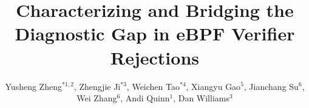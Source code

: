 \documentclass[sigplan,10pt]{acmart}
\begin{document}
\title{Characterizing and Bridging the Diagnostic Gap in eBPF Verifier Rejections}

\author{Yusheng Zheng$^{*1,2}$, Zhengjie Ji$^{*3}$, Weichen Tao$^{*4}$, Xiangyu Gao$^{5}$, Jianchang Su$^{6}$, Wei Zhang$^{6}$, Andi Quinn$^{1}$, Dan Williams$^{3}$}
\renewcommand{\authorsaddresses}{}





\end{document}
